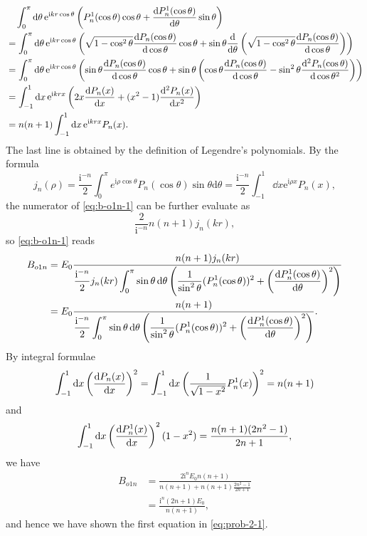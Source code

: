 \documentclass[hyperref, a4paper]{article}
\newcommand*{\ii}{\mathrm{i}}
\newcommand*{\ee}{\mathrm{e}}
\begin{document}
\[
    \begin{aligned}
        &\quad \int_0^\pi \dd{\theta} \ee^{\ii k r \cos \theta} \left( P^1_n(\cos\theta) \cos\theta + \dv{P^1_n(\cos\theta)}{\theta} \sin \theta \right) \\
        &= \int_0^\pi \dd{\theta} \ee^{\ii k r \cos \theta} \left( \sqrt{1 - \cos^2\theta} \dv{P_n(\cos\theta)}{\cos \theta } \cos\theta + \sin \theta \dv{\theta} \left( \sqrt{1 - \cos^2\theta} \dv{P_n(\cos\theta)}{\cos \theta }  \right) \right) \\
        &= \int_0^\pi \dd{\theta} \ee^{\ii k r \cos \theta} \left( \sin\theta \dv{P_n(\cos\theta)}{\cos \theta } \cos\theta + \sin \theta \left( \cos\theta \dv{P_n(\cos\theta)}{\cos\theta} - \sin^2\theta \dv[2]{P_n(\cos\theta)}{\cos\theta} \right) \right) \\
        &= \int_{-1}^1 \dd{x} \ee^{\ii k r x} \left( 2 x \dv{P_n(x)}{x} + (x^2 - 1) \dv[2]{P_n(x)}{x} \right) \\
        &= n(n+1) \int_{-1}^1 \dd{x} \ee^{\ii k r x} P_n(x).
    \end{aligned}
\] 
The last line is obtained by the definition of Legendre's polynomials.
By the formula 
\begin{equation}
    j_{n}(\rho)=\frac{\mathrm{i}^{-n}}{2} \int_{0}^{\pi} e^{\mathrm{i} \rho \cos \theta} P_{n}(\cos \theta) \sin \theta \mathrm{d} \theta = \frac{\ii^{-n}}{2} \int_{-1}^1 \dd{x} \ee^{\ii \rho x} P_n(x) ,
    \label{eq:integral-formula-1}
\end{equation}
the numerator of \eqref{eq:b-o1n-1} can be further evaluate as 
\[
    \frac{2}{\ii^{-n}} n(n+1) j_n(kr),
\]
so \eqref{eq:b-o1n-1} reads
\begin{equation}
    \begin{aligned}
        B_{o1n} &= E_0 \frac{n(n+1) j_n(kr)}{\displaystyle \frac{\ii^{-n}}{2} j_n(kr) \int_0^\pi \sin \theta \dd{\theta} \left( \frac{1}{\sin^2 \theta} (P^1_n(\cos \theta))^2 + \left( \dv{P_n^1(\cos\theta)}{\theta} \right)^2 \right) } \\
        &= E_0 \frac{n(n+1)}{\displaystyle \frac{\ii^{-n}}{2}  \int_0^\pi \sin \theta \dd{\theta} \left( \frac{1}{\sin^2 \theta} (P^1_n(\cos \theta))^2 + \left( \dv{P_n^1(\cos\theta)}{\theta} \right)^2 \right) }.
    \end{aligned}
\end{equation}
By integral formulae 
\[
    \int_{-1}^1 \dd{x} \left( \dv{P_n(x)}{x} \right)^2 = \int_{-1}^1 \dd{x} \left( \frac{1}{\sqrt{1 - x^2}} P_n^1(x) \right)^2 = n(n+1)
\]
and 
\[
    \int_{-1}^1 \dd{x} \left( \dv{P^1_n(x)}{x} \right)^2 (1 - x^2) = \frac{n(n+1)(2n^2-1)}{2n+1},
\]
we have 
\[
    \begin{aligned}
        B_{o1n} &= \frac{2 \ii^n E_0 n(n+1)}{n(n+1) + n(n+1) \frac{2n^2 - 1}{2n+1}} \\
        &= \frac{\ii^n (2n+1) E_0 }{n(n+1)},
    \end{aligned}
\]
and hence we have shown the first equation in \eqref{eq:prob-2-1}.
\end{document}
